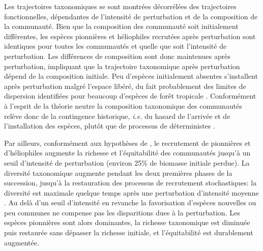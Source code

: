 \documentclass[
  11pt,
  french,
  A4paper,
  extrafontsizes,onecolumn,openright
  ]{memoir}
\begin{document}
Les trajectoires taxonomiques se sont montrées décorrélées des
trajectoires fonctionnelles, dépendantes de l'intensité de perturbation
et de la composition de la communauté. Bien que la composition des
communauté soit initialement différentes, les espèces pionnières et
héliophiles recrutées après perturbation sont identiques pour toutes les
communautés et quelle que soit l'intensité de perturbation. Les
différences de composition sont donc maintenues après perturbation,
impliquant que la trajectoire taxonomique après perturbation dépend de
la composition initiale. Peu d'espèces initialement absentes
s'installent après perturbation malgré l'espace libéré, du fait
probablement des limites de dispersion identifiées pour beaucoup
d'espèces de forêt tropicale \autocite{Svenning2005}. Conformément à
l'esprit de la théorie neutre la composition taxonomique des communautés
relève donc de la contingence historique, \emph{i.e.} du hasard de
l'arrivée et de l'installation des espèces, plutôt que de processus de
déterministes \autocite{Hubbell2001}.

Par ailleurs, conformément aux hypothèses de \textcite{Connell1978}, le
recrutement de pionnières et d'héliophiles augmente la richesse et
l'équitabilité des communautés jusqu'à un seuil d'intensité de
perturbation (environ 25\% de biomasse initiale perdue). La diversité
taxonomique augmente pendant les deux premières phases de la succession,
jusqu'à la restauration des processus de recrutement stochastiques: la
diversité est maximale quelque temps après une perturbation d'intensité
moyenne \autocite[\textcite{Guitet2018}]{Molino2001}. Au delà d'un seuil
d'intensité en revanche la favorisation d'espèces nouvelles ou peu
communes ne compense pas les disparitions dues à la perturbation. Les
espèces pionnières sont alors dominantes, la richesse taxonomique est
diminuée puis restaurée sans dépasser la richesse initiale, et
l'équitabilité est durablement augmentée.
\end{document}

